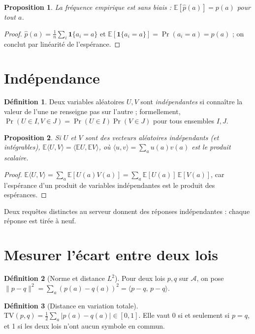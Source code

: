 \documentclass[11pt,a4paper]{report}
\theoremstyle{definition}
\newtheorem{definition}{Définition}[chapter]
\theoremstyle{plain}
\newtheorem{proposition}{Proposition}[chapter]
\newcommand{\E}{\mathbb{E}}
\begin{document}
\begin{proposition}\label{prop:freq}
La fréquence empirique est sans biais : $\E[\hat p(a)] = p(a)$ pour tout $a$.
\end{proposition}
\begin{proof}
$\hat p(a) = \frac1n\sum_i \mathbf 1\{a_i=a\}$ et $\E[\mathbf 1\{a_i=a\}] = \Pr(a_i=a) = p(a)$ ; on conclut par linéarité de l'espérance.
\end{proof}

\section{Indépendance}

\begin{definition}
Deux variables aléatoires $U,V$ sont \emph{indépendantes} si connaître la valeur de l'une ne renseigne pas sur l'autre ; formellement, $\Pr(U\in I, V\in J) = \Pr(U\in I)\Pr(V\in J)$ pour tous ensembles $I,J$.
\end{definition}

\begin{proposition}\label{prop:indep}
Si $U$ et $V$ sont des vecteurs aléatoires indépendants (et intégrables), $\E\langle U,V\rangle = \langle \E U, \E V\rangle$, où $\langle u,v\rangle = \sum_a u(a)v(a)$ est le produit scalaire.
\end{proposition}
\begin{proof}
$\E\langle U,V\rangle = \sum_a \E[U(a)V(a)] = \sum_a \E[U(a)]\,\E[V(a)]$, car l'espérance d'un produit de variables indépendantes est le produit des espérances.
\end{proof}

Deux requêtes distinctes au serveur donnent des réponses indépendantes : chaque réponse est tirée à neuf.

\section{Mesurer l'écart entre deux lois}

\begin{definition}[Norme et distance $L^2$]
Pour deux lois $p,q$ sur $\mathcal A$, on pose $\|p-q\|^2 = \sum_a (p(a)-q(a))^2 = \langle p-q,\,p-q\rangle$.
\end{definition}

\begin{definition}[Distance en variation totale]
$\mathrm{TV}(p,q) = \frac12\sum_a |p(a)-q(a)| \in [0,1]$. Elle vaut 0 si et seulement si $p=q$, et 1 si les deux lois n'ont aucun symbole en commun.
\end{definition}
\end{document}

